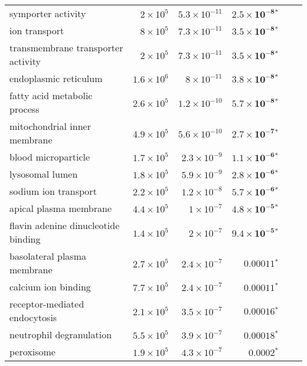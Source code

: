 \begin{longtable}{|l|r|r|r|r|r|}
    symporter activity                        & $ 2\times 10^{5}$  & $5.3\times 10^{-11}$ & $\bm{2.5\times 10^{-8}{^*}}$    \\
    ion transport                             & $ 8\times 10^{5}$  & $7.3\times 10^{-11}$ & $\bm{3.5\times 10^{-8}{^*}}$    \\
    transmembrane transporter activity        & $ 2\times 10^{5}$  & $7.3\times 10^{-11}$ & $\bm{3.5\times 10^{-8}{^*}}$    \\
    endoplasmic reticulum                     & $1.6\times 10^{6}$ & $ 8\times 10^{-11}$  & $\bm{3.8\times 10^{-8}{^*}}$    \\
    fatty acid metabolic process              & $2.6\times 10^{5}$ & $1.2\times 10^{-10}$ & $\bm{5.7\times 10^{-8}{^*}}$    \\
    mitochondrial inner membrane              & $4.9\times 10^{5}$ & $5.6\times 10^{-10}$ & $\bm{2.7\times 10^{-7}{^*}}$    \\
    blood microparticle                       & $1.7\times 10^{5}$ & $2.3\times 10^{-9}$  & $\bm{1.1\times 10^{-6}{^*}}$    \\
    lysosomal lumen                           & $1.8\times 10^{5}$ & $5.9\times 10^{-9}$  & $\bm{2.8\times 10^{-6}{^*}}$    \\
    sodium ion transport                      & $2.2\times 10^{5}$ & $1.2\times 10^{-8}$  & $\bm{5.7\times 10^{-6}{^*}}$    \\
    apical plasma membrane                    & $4.4\times 10^{5}$ & $ 1\times 10^{-7}$   & $\bm{4.8\times 10^{-5}{^*}}$    \\
    flavin adenine dinucleotide binding       & $1.4\times 10^{5}$ & $ 2\times 10^{-7}$   & $\bm{9.4\times 10^{-5}{^*}}$    \\
    basolateral plasma membrane               & $2.7\times 10^{5}$ & $2.4\times 10^{-7}$  & $\bm{0.00011{^*}}$              \\
    calcium ion binding                       & $7.7\times 10^{5}$ & $2.4\times 10^{-7}$  & $\bm{0.00011{^*}}$              \\
    receptor-mediated endocytosis             & $2.1\times 10^{5}$ & $3.5\times 10^{-7}$  & $\bm{0.00016{^*}}$              \\
    neutrophil degranulation                  & $5.5\times 10^{5}$ & $3.9\times 10^{-7}$  & $\bm{0.00018{^*}}$              \\
    peroxisome                                & $1.9\times 10^{5}$ & $4.3\times 10^{-7}$  & $\bm{0.0002{^*}}$               \\

\end{longtable}
